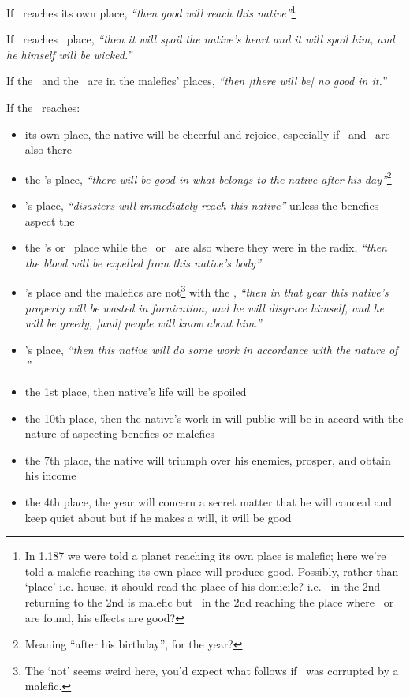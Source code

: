 If  \Saturn\, reaches its own place, \textsl{``then good will reach this native''}\footnote{In 1.187 we were told a planet reaching its own place is malefic; here we're told a malefic reaching its own place will produce good. Possibly, rather than `place' i.e. house, it should read the place of his domicile? i.e. \Saturn\, in the 2nd returning to the 2nd is malefic but \Saturn\, in the 2nd reaching the place where \Capricorn\, or \Aquarius\, are found, his effects are good?}

If  \Saturn\, reaches \Mars\, place, \textsl{``then it will spoil the native's heart and it will spoil him, and he himself will be wicked.''}

If  the \Sun\, and the \Moon\, are in the malefics' places, \textsl{``then [there will be] no good in it.''}

If  the \Moon\, reaches:
\begin{itemize}[topsep=0em,itemsep=0em]
\item its own place, the native will be cheerful and rejoice, especially if \Venus\, and \Jupiter\, are also there

\item the \Sun's place, \textsl{``there will be good in what belongs to the native after his day''}\footnote{Meaning ``after his birthday'', for the year?}

\item \Mars's place, \textsl{``disasters will immediately reach this native''} unless the benefics aspect the \Moon

\item the \Sun's or \Mars\, place while the \Sun\, or \Mars\, are also where they were in the radix, \textsl{``then the blood will be expelled from this native's body''}

\item \Venus's place and the malefics are not\footnote{The `not' seems weird here, you'd expect what follows if \Venus\, was corrupted by a malefic.} with the \Moon, \textsl{``then in that year this native's property will be wasted in fornication, and he will disgrace himself, and he will be greedy, [and] people will know about him.''}

\item \Mercury's place, \textsl{``then this native will do some work in accordance with the nature of \Mercury''}

\item the 1st place, then native's life will be spoiled

\item the 10th place, then the native's work in will public will be in accord with the nature of aspecting benefics or malefics

\item the 7th place, the native will triumph over his enemies, prosper, and obtain his income

\item the 4th place, the year will concern a secret matter that he will conceal and keep quiet about but if he makes a will, it will be good
\end{itemize}

